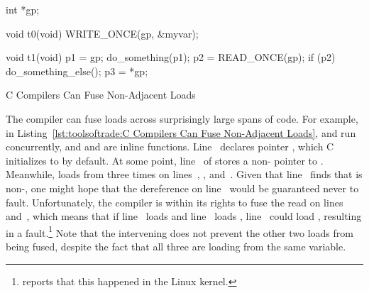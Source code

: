 \begin{listing}[tbp]
\begin{fcvlabel}
\begin{VerbatimL}[commandchars=\\\[\]]
int *gp; \lnlbl[gp]

void t0(void)
{
	WRITE_ONCE(gp, &myvar); \lnlbl[wgp]
}

void t1(void)
{
	p1 = gp; \lnlbl[p1]
	do_something(p1);
	p2 = READ_ONCE(gp); \lnlbl[p2]
	if (p2) { \lnlbl[if]
		do_something_else();
		p3 = *gp; \lnlbl[p3]
	}
}
\end{VerbatimL}
\end{fcvlabel}
\caption{C Compilers Can Fuse Non-Adjacent Loads}
\label{lst:toolsoftrade:C Compilers Can Fuse Non-Adjacent Loads}
\end{listing}

\begin{fcvref}
The compiler can fuse loads across surprisingly large spans of code.
For example, in
Listing~\ref{lst:toolsoftrade:C Compilers Can Fuse Non-Adjacent Loads},
 and  run concurrently, and  and
 are inline functions.
Line~ declares pointer , which C initializes to 
by default.
At some point, line~ of  stores a non-
pointer to .
Meanwhile,  loads from  three times on
lines~, , and~.
Given that line~ finds that  is non-, one might
hope that the dereference on line~ would be guaranteed never
to fault.
Unfortunately, the compiler is within its rights to fuse the read on
lines~ and~, which means that if line~
loads  and line~ loads , line~
could load , resulting in a fault.\footnote{
	 reports that this happened in the Linux kernel.}
Note that the intervening  does not prevent the other
two loads from being fused, despite the fact that all three are loading
from the same variable.
\end{fcvref}

\QuickQuizEnd

